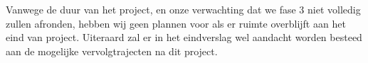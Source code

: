 Vanwege de duur van het project, en onze verwachting dat we fase 3 niet volledig zullen afronden, hebben wij geen plannen voor als er ruimte overblijft aan het eind van project. 
Uiteraard zal er in het eindverslag wel aandacht worden besteed aan de mogelijke vervolgtrajecten na dit project.
\pagebreak
